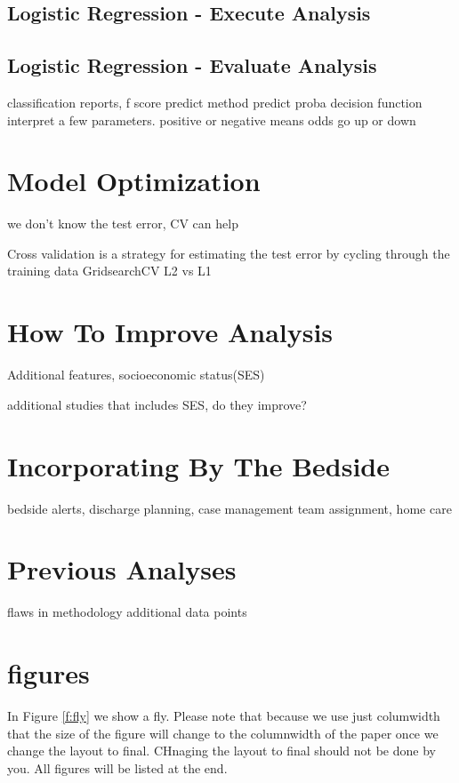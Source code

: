 \documentclass[sigconf]{acmart}
\begin{document}
\subsection{Logistic Regression - Execute Analysis}


\subsection{Logistic Regression - Evaluate Analysis}

classification reports, f score
predict method
predict proba
decision function
interpret a few parameters. positive or negative means odds go up or down




\section{Model Optimization}

we don't know the test error, CV can help

Cross validation is a strategy for estimating the test error by cycling through the training data \cite{cite03}
GridsearchCV
L2 vs L1

\section{How To Improve Analysis}

Additional features, socioeconomic status(SES)

additional studies that includes SES, do they improve?


\section{Incorporating By The Bedside}
bedside alerts, discharge planning, case management team assignment, home care

\section{Previous Analyses}

flaws in methodology
additional data points

\section{figures}

In Figure \ref{f:fly} we show a fly. Please note that because we use
just columwidth that the size of the figure will change to the
columnwidth of the paper once we change the layout to final. CHnaging
the layout to final should not be done by you. All figures will be
listed at the end.
\end{document}
